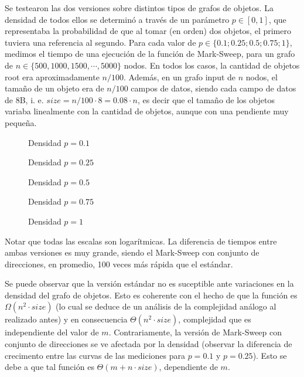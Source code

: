 Se testearon las dos versiones sobre distintos tipos de grafos de objetos. La densidad de todos ellos se determinó a través de un parámetro $p \in [0, 1]$, que representaba la probabilidad de que al tomar (en orden) dos objetos, el primero tuviera una referencia al segundo. Para cada valor de $p \in \{0.1; 0.25; 0.5; 0.75; 1\}$, medimos el tiempo de una ejecución de la función de Mark-Sweep, para un grafo de $n \in \{500, 1000, 1500, \cdots, 5000\}$ nodos. En todos los casos, la cantidad de objetos root era aproximadamente $n / 100$. Además, en un grafo input de $n$ nodos, el tamaño de un objeto era de $n / 100$ campos de datos, siendo cada campo de datos de 8B, i. e. $size = n / 100 \cdot 8 = 0.08 \cdot n$, es decir que el tamaño de los objetos variaba linealmente con la cantidad de objetos, aunque con una pendiente muy pequeña.

\begin{figure}[H]
\centering

\caption{Densidad $p = 0.1$}
\end{figure}

\begin{figure}[H]
\centering

\caption{Densidad $p = 0.25$}
\end{figure}

\begin{figure}[H]
\centering

\caption{Densidad $p = 0.5$}
\end{figure}

\begin{figure}[H]
\centering

\caption{Densidad $p = 0.75$}
\end{figure}

\begin{figure}[H]
\centering

\caption{Densidad $p = 1$}
\end{figure}

Notar que todas las escalas son logarítmicas. La diferencia de tiempos entre ambas versiones es muy grande, siendo el Mark-Sweep con conjunto de direcciones, en promedio, 100 veces más rápida que el estándar.

Se puede observar que la versión estándar no es suceptible ante variaciones en la densidad del grafo de objetos. Esto es coherente con el hecho de que la función es $\Omega(n^2 \cdot size)$ (lo cual se deduce de un análisis de la complejidad análogo al realizado antes) y en consecuencia $\Theta(n^2 \cdot size)$, complejidad que es independiente del valor de $m$. Contrariamente, la versión de Mark-Sweep con conjunto de direcciones se ve afectada por la densidad (observar la diferencia de crecimento entre las curvas de las mediciones para $p = 0.1$ y $p = 0.25$). Esto se debe a que tal función es $\Theta(m + n \cdot size)$, dependiente de $m$.

